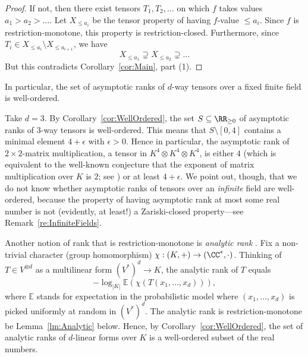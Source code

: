 \documentclass{amsart}
\newcommand{\EE}{\mathbb{E}}
\newcommand{\comment}[1]{}
\begin{document}
\begin{proof}
If not, then there exist tensors $T_1,T_2,\ldots$ on which $f$ takes
values $a_1>a_2>\ldots$. Let $X_{\leq a_i}$ be the tensor property of
having $f$-value $\leq a_i$. Since $f$ is restriction-monotone, this property is
restriction-closed. Furthermore, since $T_i \in X_{\leq a_i}
\setminus X_{\leq a_{i+1}}$, we have 
\[ X_{\leq a_1} \supsetneq X_{\leq a_2} \supsetneq \ldots \]
But this contradicts Corollary~\ref{cor:Main}, part (1). 
\end{proof}

In particular, the set of asymptotic ranks of $d$-way tensors over a
fixed finite field is well-ordered. 

\begin{ex}
Take $d=3$. By Corollary~\ref{cor:WellOrdered}, the set $S \subseteq
\RR_{\geq 0}$ of asymptotic ranks of $3$-way tensors is well-ordered. This
means that $S \setminus [0,4]$ contains a minimal element $4+\epsilon$
with $\epsilon>0$. Hence in particular, the asymptotic rank of $2 \times
2$-matrix multiplication, a tensor in $K^4 \otimes K^4 \otimes K^4$,
is either $4$ (which is equivalent to the well-known conjecture that the
exponent of matrix multiplication over $K$ is $2$; see \cite{Conner21})
or at least $4+\epsilon$. We point out, though, that we do not know
whether asymptotic ranks of tensors over an {\em infinite} field are
well-ordered, because the property of having asymptotic rank at most some
real number is not (evidently, at least!) a Zariski-closed property---see
Remark~\ref{re:InfiniteFields}.
\end{ex}

\comment{
\begin{ex}
By \cite{}, any $d$-way tensor either has asymptotic rank
$0$ (in which case it is zero), or $1$ 
(in which case it is a tensor product of vectors), or asymptotic
rank $\geq ..$. The existence of such gaps is a consequence of
Corollary~\ref{cor:WellOrdered}.
\end{ex}
}

\begin{ex}
Another notion of rank that is restriction-monotone is {\em analytic
rank} \cite{Lovett19}. Fix
a non-trivial character (group homomorphism) $\chi:(K,+) \to
(\CC^*,\cdot)$. Thinking of $T \in V^{\otimes d}$ as a multilinear form
$(V^*)^d \to K$, the analytic rank of $T$ equals
\[ -\log_{|K|} \EE(\chi(T(x_1,\ldots,x_d))), \]
where $\EE$ stands for expectation in the probabilistic model where 
$(x_1,\ldots,x_d)$ is picked uniformly at random in $(V^*)^d$.
The analytic rank is
restriction-monotone be Lemma~\ref{lm:Analytic} below. Hence, by
Corollary~\ref{cor:WellOrdered}, the set of analytic ranks of $d$-linear
forms over $K$ is a well-ordered subset of the real numbers.
\end{ex}
\end{document}
